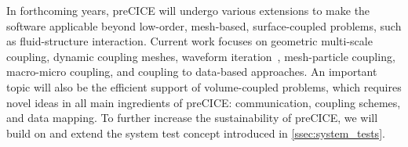 In forthcoming years, preCICE will undergo various extensions to make the software applicable beyond low-order, mesh-based, surface-coupled problems, such as fluid-structure interaction. Current work focuses on geometric multi-scale coupling, dynamic coupling meshes, waveform iteration~\cite{QNWI}, mesh-particle coupling, macro-micro coupling, and coupling to data-based approaches. An important topic will also be the efficient support of volume-coupled problems, which requires novel ideas in all main ingredients of preCICE: communication, coupling schemes, and data mapping.
To further increase the sustainability of preCICE, we will build on and extend the system test concept introduced in \autoref{ssec:system_tests}.
